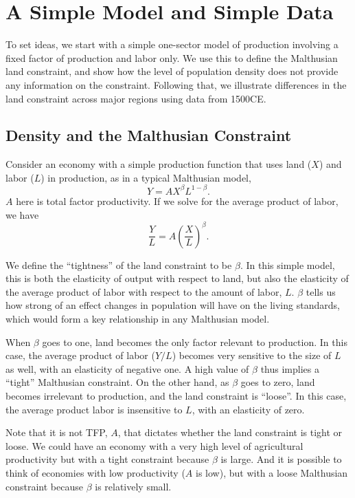 \documentclass[11pt]{article}
\begin{document}
\section{A Simple Model and Simple Data}
To set ideas, we start with a simple one-sector model of production involving a fixed factor of production and labor only. We use this to define the Malthusian land constraint, and show how the level of population density does not provide any information on the constraint. Following that, we illustrate differences in the land constraint across major regions using data from 1500CE. 

\subsection{Density and the Malthusian Constraint}
Consider an economy with a simple production function that uses land ($X$) and labor ($L$) in production, as in a typical Malthusian model,
\begin{equation}
Y = A X^\beta L^{1-\beta}.
\end{equation}
$A$ here is total factor productivity. If we solve for the average product of labor, we have
\begin{equation}
    \frac{Y}{L} = A \left(\frac{X}{L}\right)^{\beta}.
\end{equation}

We define the ``tightness'' of the land constraint to be $\beta$. In this simple model, this is both the elasticity of output with respect to land, but also the elasticity of the average product of labor with respect to the amount of labor, $L$. $\beta$ tells us how strong of an effect changes in population will have on the living standards, which would form a key relationship in any Malthusian model.

When $\beta$ goes to one, land becomes the only factor relevant to production. In this case, the average product of labor ($Y/L$) becomes very sensitive to the size of $L$ as well, with an elasticity of negative one. A high value of $\beta$ thus implies a ``tight'' Malthusian constraint. On the other hand, as $\beta$ goes to zero, land becomes irrelevant to production, and the land constraint is ``loose''. In this case, the average product labor is insensitive to $L$, with an elasticity of zero.

Note that it is not TFP, $A$, that dictates whether the land constraint is tight or loose. We could have an economy with a very high level of agricultural productivity but with a tight constraint because $\beta$ is large. And it is possible to think of economies with low productivity ($A$ is low), but with a loose Malthusian constraint because $\beta$ is relatively small.
\end{document}
